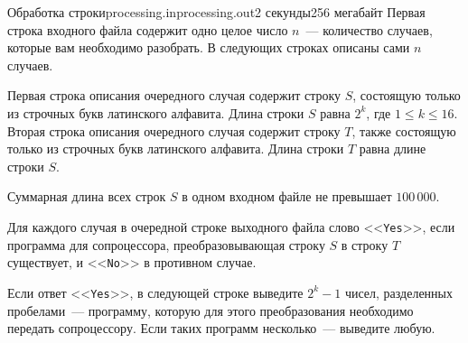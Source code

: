 \begin{problem}{Обработка строки}{processing.in}{processing.out}{2 секунды}{256 мегабайт}
\InputFile
Первая строка входного файла содержит одно целое число $n$~--- количество случаев, 
которые вам необходимо разобрать. В следующих строках описаны сами $n$ случаев.

Первая строка описания очередного случая содержит строку $S$, состоящую только из строчных букв 
латинского алфавита. Длина строки $S$ равна $2^k$, где 
$1 \le k \le 16$. Вторая строка описания очередного случая содержит строку $T$, также состоящую 
только из строчных букв латинского алфавита. Длина строки $T$ равна длине 
строки $S$.

Суммарная длина всех строк $S$ в одном входном файле не превышает $100\,000$.

\OutputFile
Для каждого случая в очередной строке выходного файла слово <<\texttt{Yes}>>, если программа для 
сопроцессора, преобразовывающая строку $S$ в строку $T$ существует, и 
<<\texttt{No}>> в противном случае. 

Если ответ <<\texttt{Yes}>>, в следующей строке выведите $2^k - 1$ чисел, разделенных пробелами~--- 
программу, которую для этого преобразования необходимо передать сопроцессору. 
Если таких программ несколько~--- выведите любую.

\Examples
\begin{example}%
%
\end{example}

\end{problem}

